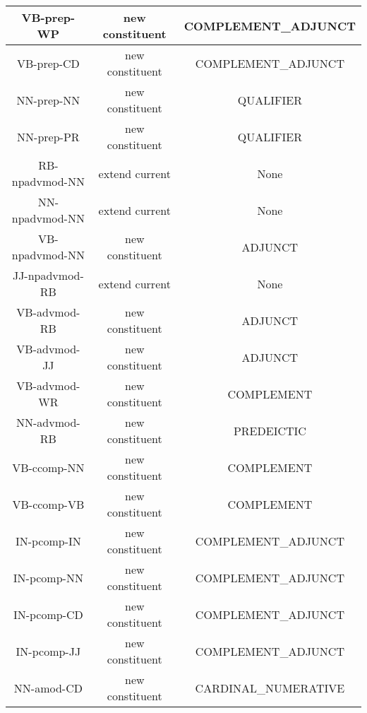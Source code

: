 \begin{table}[]
{\begin{tabular}{|c|c|c|}
            VB-prep-WP            & new constituent             & COMPLEMENT\_ADJUNCT     \\ \hline
            VB-prep-CD            & new constituent             & COMPLEMENT\_ADJUNCT     \\ \hline
            NN-prep-NN            & new constituent             & QUALIFIER               \\ \hline
            NN-prep-PR            & new constituent             & QUALIFIER               \\ \hline
            RB-npadvmod-NN        & extend current              & None                    \\ \hline
            NN-npadvmod-NN        & extend current              & None                    \\ \hline
            VB-npadvmod-NN        & new constituent             & ADJUNCT                 \\ \hline
            JJ-npadvmod-RB        & extend current              & None                    \\ \hline
            VB-advmod-RB          & new constituent             & ADJUNCT                 \\ \hline
            VB-advmod-JJ          & new constituent             & ADJUNCT                 \\ \hline
            VB-advmod-WR          & new constituent             & COMPLEMENT              \\ \hline
            NN-advmod-RB          & new constituent             & PREDEICTIC              \\ \hline
            VB-ccomp-NN           & new constituent             & COMPLEMENT              \\ \hline
            VB-ccomp-VB           & new constituent             & COMPLEMENT              \\ \hline
            IN-pcomp-IN           & new constituent             & COMPLEMENT\_ADJUNCT     \\ \hline
            IN-pcomp-NN           & new constituent             & COMPLEMENT\_ADJUNCT     \\ \hline
            IN-pcomp-CD           & new constituent             & COMPLEMENT\_ADJUNCT     \\ \hline
            IN-pcomp-JJ           & new constituent             & COMPLEMENT\_ADJUNCT     \\ \hline
            NN-amod-CD            & new constituent             & CARDINAL\_NUMERATIVE    \\ \hline

\end{tabular}}
\end{table}
